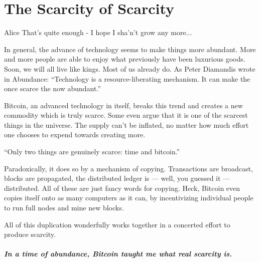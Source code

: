 
\chapter{ The Scarcity of Scarcity}
\label{les:2}

\begin{chapquote}{Alice}
That's quite enough - I hope I sha'n't grow any more...
\end{chapquote}

In general, the advance of technology seems to make things more abundant. More
and more people are able to enjoy what previously have been luxurious goods.
Soon, we will all live like kings. Most of us already do. As Peter Diamandis
wrote in Abundance\cite{abundance}: ``Technology is a resource-liberating
mechanism. It can make the once scarce the now abundant.''

Bitcoin, an advanced technology in itself, breaks this trend and creates
a new commodity which is truly scarce. Some even argue that it is one of
the scarcest things in the universe. The supply can't be inflated, no
matter how much effort one chooses to expend towards creating more.

\begin{chapquote}{\cite{bitcoinstandard-pres}}
``Only two things are genuinely scarce: time and
bitcoin.''
\end{chapquote}

Paradoxically, it does so by a mechanism of copying. Transactions are
broadcast, blocks are propagated, the distributed ledger is --- well,
you guessed it --- distributed. All of these are just fancy words for
copying. Heck, Bitcoin even copies itself onto as many computers as it
can, by incentivizing individual people to run full nodes and mine new
blocks.

All of this duplication wonderfully works together in a concerted effort
to produce scarcity.

\paragraph{In a time of abundance, Bitcoin taught me what real scarcity is.}

